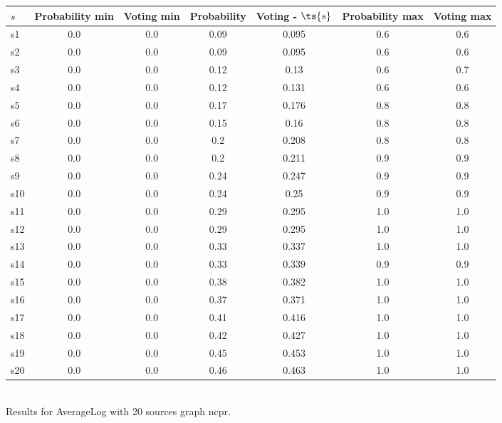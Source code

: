 \documentclass{article}
\begin{document}
\noindent\begin{tabular}{|l|c|c|c|c|c|c|}
\hline
$s$& Probability min & Voting min & Probability & Voting - $\ts{s}$ & Probability max & Voting max\\
\hline
s1 &0.0 & 0.0 & 0.09 & 0.095 & 0.6 & 0.6\\
\hline
s2 &0.0 & 0.0 & 0.09 & 0.095 & 0.6 & 0.6\\
\hline
s3 &0.0 & 0.0 & 0.12 & 0.13 & 0.6 & 0.7\\
\hline
s4 &0.0 & 0.0 & 0.12 & 0.131 & 0.6 & 0.6\\
\hline
s5 &0.0 & 0.0 & 0.17 & 0.176 & 0.8 & 0.8\\
\hline
s6 &0.0 & 0.0 & 0.15 & 0.16 & 0.8 & 0.8\\
\hline
s7 &0.0 & 0.0 & 0.2 & 0.208 & 0.8 & 0.8\\
\hline
s8 &0.0 & 0.0 & 0.2 & 0.211 & 0.9 & 0.9\\
\hline
s9 &0.0 & 0.0 & 0.24 & 0.247 & 0.9 & 0.9\\
\hline
s10 &0.0 & 0.0 & 0.24 & 0.25 & 0.9 & 0.9\\
\hline
s11 &0.0 & 0.0 & 0.29 & 0.295 & 1.0 & 1.0\\
\hline
s12 &0.0 & 0.0 & 0.29 & 0.295 & 1.0 & 1.0\\
\hline
s13 &0.0 & 0.0 & 0.33 & 0.337 & 1.0 & 1.0\\
\hline
s14 &0.0 & 0.0 & 0.33 & 0.339 & 0.9 & 0.9\\
\hline
s15 &0.0 & 0.0 & 0.38 & 0.382 & 1.0 & 1.0\\
\hline
s16 &0.0 & 0.0 & 0.37 & 0.371 & 1.0 & 1.0\\
\hline
s17 &0.0 & 0.0 & 0.41 & 0.416 & 1.0 & 1.0\\
\hline
s18 &0.0 & 0.0 & 0.42 & 0.427 & 1.0 & 1.0\\
\hline
s19 &0.0 & 0.0 & 0.45 & 0.453 & 1.0 & 1.0\\
\hline
s20 &0.0 & 0.0 & 0.46 & 0.463 & 1.0 & 1.0\\
\hline
\end{tabular}\\

\noindent Results for AverageLog with 20 sources graph ncpr.
\end{document}
